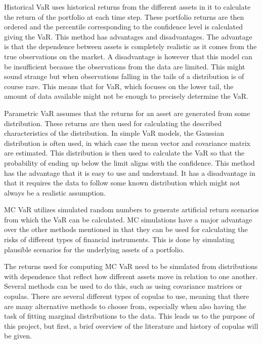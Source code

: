 Historical \gls{VaR} uses historical returns from the different assets in it to calculate the return of the portfolio at each time step. These portfolio returns are then ordered and the percentile corresponding to the confidence level is calculated giving the \gls{VaR}. This method has advantages and disadvantages. The advantage is that the dependence between assets is completely realistic as it comes from the true observations on the market\footnotemark[\value{footnote}]. A disadvantage is however that this model can be insufficient because the observations from the data are limited. This might sound strange but when observations falling in the tails of a distribution is of course rare. This means that for \gls{VaR}, which focuses on the lower tail, the amount of data available might not be enough to precisely determine the \gls{VaR}.  

Parametric \gls{VaR} assumes that the returns for an asset are generated from some distribution. These returns are then used for calculating the described characteristics of the distribution. In simple \gls{VaR} models, the Gaussian distribution is often used, in which case the mean vector and covariance matrix are estimated. This distribution is then used to calculate the \gls{VaR} so that the probability of ending up below the limit aligns with the confidence\footnotemark[\value{footnote}]. This method has the advantage that it is easy to use and understand. It has a disadvantage in that it requires the data to follow some known distribution which might not always be a realistic assumption.  

\gls{MC} \gls{VaR} utilizes simulated random numbers to generate artificial return scenarios from which the \gls{VaR} can be calculated\footnotemark[\value{footnote}]. \gls{MC} simulations have a major advantage over the other methods mentioned in that they can be used for calculating the risks of different types of financial instruments. This is done by simulating plausible scenarios for the underlying assets of a portfolio.  

The returns used for computing \gls{MC} \gls{VaR} need to be simulated from distributions with dependence that reflect how different assets move in relation to one another. Several methods can be used to do this, such as using covariance matrices or copulas. There are several different types of copulas to use, meaning that there are many alternative methods to choose from, especially when also having the task of fitting marginal distributions to the data. This leads us to the purpose of this project, but first, a brief overview of the literature and history of copulas will be given.

